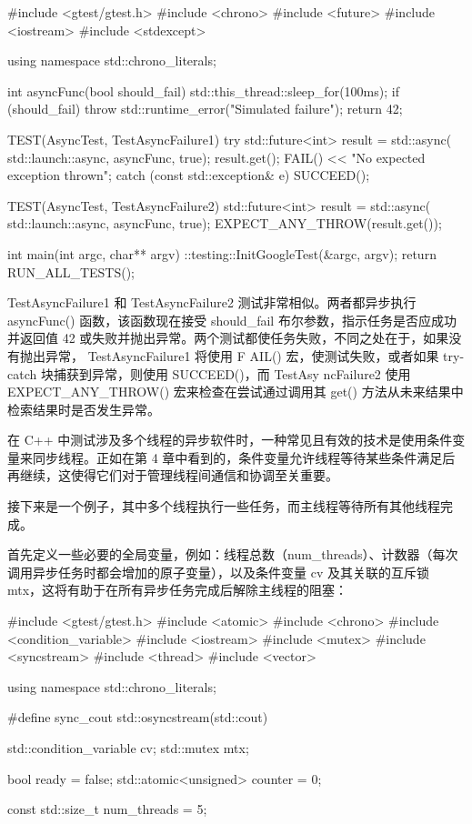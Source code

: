 \begin{cpp}
#include <gtest/gtest.h>
#include <chrono>
#include <future>
#include <iostream>
#include <stdexcept>

using namespace std::chrono_literals;

int asyncFunc(bool should_fail) {
    std::this_thread::sleep_for(100ms);
    if (should_fail) {
        throw std::runtime_error("Simulated failure");
    }
    return 42;
}

TEST(AsyncTest, TestAsyncFailure1) {
    try {
        std::future<int> result = std::async(
                                std::launch::async,
                                asyncFunc, true);
        result.get();
        FAIL() << "No expected exception thrown";
    } catch (const std::exception& e) {
        SUCCEED();
    }
}

TEST(AsyncTest, TestAsyncFailure2) {
    std::future<int> result = std::async(
                            std::launch::async,
                            asyncFunc, true);
    EXPECT_ANY_THROW(result.get());
}

int main(int argc, char** argv) {
    ::testing::InitGoogleTest(&argc, argv);
    return RUN_ALL_TESTS();
}
\end{cpp}

TestAsyncFailure1 和 TestAsyncFailure2 测试非常相似。两者都异步执行 asyncFunc() 函数，该函数现在接受 should\_fail 布尔参数，指示任务是否应成功并返回值 42 或失败并抛出异常。两个测试都使任务失败，不同之处在于，如果没有抛出异常， TestAsyncFailure1 将使用 F AIL() 宏，使测试失败，或者如果 try-catch 块捕获到异常，则使用 SUCCEED()，而 TestAsy ncFailure2 使用 EXPECT\_ANY\_THROW() 宏来检查在尝试通过调用其 get() 方法从未来结果中检索结果时是否发生异常。


在 C++ 中测试涉及多个线程的异步软件时，一种常见且有效的技术是使用条件变量来同步线程。正如在第 4 章中看到的，条件变量允许线程等待某些条件满足后再继续，这使得它们对于管理线程间通信和协调至关重要。

接下来是一个例子，其中多个线程执行一些任务，而主线程等待所有其他线程完成。

首先定义一些必要的全局变量，例如：线程总数（num\_threads）、计数器（每次调用异步任务时都会增加的原子变量），以及条件变量 cv 及其关联的互斥锁 mtx，这将有助于在所有异步任务完成后解除主线程的阻塞：

\begin{cpp}
#include <gtest/gtest.h>
#include <atomic>
#include <chrono>
#include <condition_variable>
#include <iostream>
#include <mutex>
#include <syncstream>
#include <thread>
#include <vector>

using namespace std::chrono_literals;

#define sync_cout std::osyncstream(std::cout)

std::condition_variable cv;
std::mutex mtx;

bool ready = false;
std::atomic<unsigned> counter = 0;

const std::size_t num_threads = 5;
\end{cpp}

